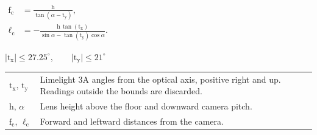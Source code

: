 \documentclass[11pt]{article}
\newcommand{\vname}[1]{\text{#1}}
\newcommand{\sine}{\mathop{\vname{sin}}\nolimits}
\newcommand{\cosine}{\mathop{\vname{cos}}\nolimits}
\newcommand{\tangent}{\mathop{\vname{tan}}\nolimits}
\begin{document}
\pagecolor{panel}
\color{white}

\begin{minipage}[t]{0.28\linewidth}
  \begin{minipage}[c][32mm][c]{\linewidth}
    \large
    \(\displaystyle
    \begin{aligned}
      \vname{f}_{\vname{c}}
        &= \frac{\vname{h}}{\tangent(\alpha-\vname{t}_{\vname{y}})},\\
      \ell_{\vname{c}}
        &= -\frac{\vname{h}\,\tangent(\vname{t}_{\vname{x}})}
          {\sine\alpha-\tangent(\vname{t}_{\vname{y}})\cosine\alpha}.
    \end{aligned}
    \)\par
    \smallskip
    \(\lvert\vname{t}_{\vname{x}}\rvert \le 27.25^\circ,\qquad
      \lvert\vname{t}_{\vname{y}}\rvert \le 21^\circ\)
  \end{minipage}\par
  \begin{tabularx}{\linewidth}{@{}l >{\raggedright\arraybackslash}X@{}}
    \(\vname{t}_{\vname{x}},\,\vname{t}_{\vname{y}}\)
      & Limelight 3A angles from the optical axis, positive right and up.
        Readings outside the bounds are discarded. \\
    \(\vname{h},\,\alpha\) & Lens height above the floor and downward camera pitch. \\
    \(\vname{f}_{\vname{c}},\,\ell_{\vname{c}}\)
      & Forward and leftward distances from the camera. \\
  \end{tabularx}
\end{minipage}\hfill
\end{document}
